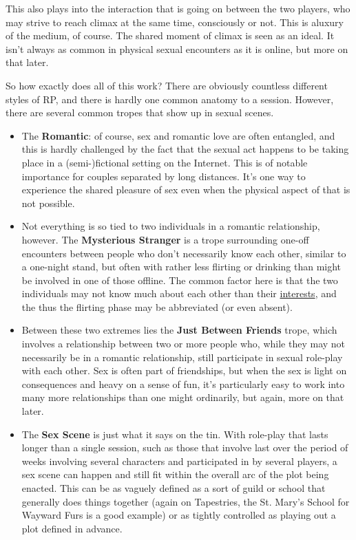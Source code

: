 This also plays into the interaction that is going on between the two players, who may strive to reach climax at the same time, consciously or not. This is aluxury of the medium, of course. The shared moment of climax is seen as an ideal. It isn't always as common in physical sexual encounters as it is online, but more on that later.

So how exactly does all of this work? There are obviously countless different styles of RP, and there is hardly one common anatomy to a session. However, there are several common tropes that show up in sexual scenes.

\begin{itemize}
\tightlist
\item
  The \textbf{Romantic}: of course, sex and romantic love are often entangled, and this is hardly challenged by the fact that the sexual act happens to be taking place in a (semi-)fictional setting on the Internet. This is of notable importance for couples separated by long distances. It's one way to experience the shared pleasure of sex even when the physical aspect of that is not possible.
\item
  Not everything is so tied to two individuals in a romantic relationship, however. The \textbf{Mysterious Stranger} is a trope surrounding one-off encounters between people who don't necessarily know each other, similar to a one-night stand, but often with rather less flirting or drinking than might be involved in one of those offline. The common factor here is that the two individuals may not know much about each other than their \href{http://adjectivespecies.com/wp-content/uploads/2011/11/Tapestries_Flow.png}{interests}, and the thus the flirting phase may be abbreviated (or even absent).
\item
  Between these two extremes lies the \textbf{Just Between Friends} trope, which involves a relationship between two or more people who, while they may not necessarily be in a romantic relationship, still participate in sexual role-play with each other. Sex is often part of friendships, but when the sex is light on consequences and heavy on a sense of fun, it's particularly easy to work into many more relationships than one might ordinarily, but again, more on that later.
\item
  The \textbf{Sex Scene} is just what it says on the tin. With role-play that lasts longer than a single session, such as those that involve last over the period of weeks involving several characters and participated in by several players, a sex scene can happen and still fit within the overall arc of the plot being enacted. This can be as vaguely defined as a sort of guild or school that generally does things together (again on Tapestries, the St. Mary's School for Wayward Furs is a good example) or as tightly controlled as playing out a plot defined in advance.
\end{itemize}

